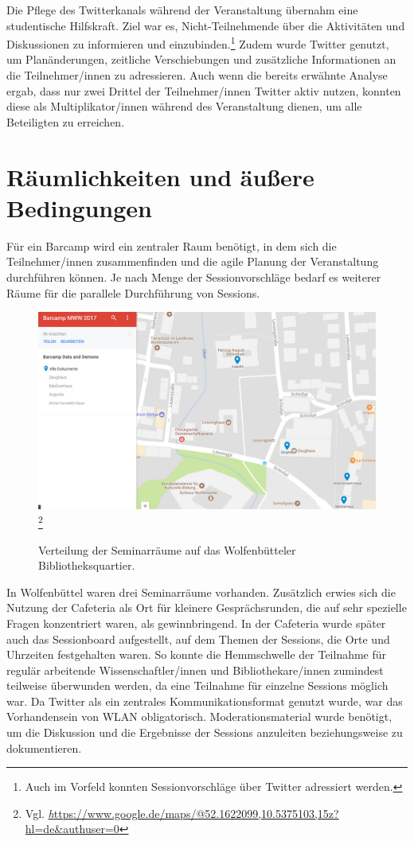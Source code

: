 \documentclass[a4paper,
fontsize=11pt,
oneside,
numbers=noperiodatend,
parskip=half-,
bibliography=totoc,
final
]{scrartcl}
\begin{document}
Die Pflege des Twitterkanals während der Veranstaltung übernahm eine
studentische Hilfskraft. Ziel war es, Nicht-Teilnehmende über die
Aktivitäten und Diskussionen zu informieren und einzubinden.\footnote{Auch
  im Vorfeld konnten Sessionvorschläge über Twitter adressiert werden.}
Zudem wurde Twitter genutzt, um Planänderungen, zeitliche Verschiebungen
und zusätzliche Informationen an die Teilnehmer/innen zu adressieren.
Auch wenn die bereits erwähnte Analyse ergab, dass nur zwei Drittel der
Teilnehmer/innen Twitter aktiv nutzen, konnten diese als
Multiplikator/innen während des Veranstaltung dienen, um alle
Beteiligten zu erreichen.

\section{Räumlichkeiten und äußere
Bedingungen}\label{ruxe4umlichkeiten-und-uxe4uuxdfere-bedingungen}

Für ein Barcamp wird ein zentraler Raum benötigt, in dem sich die
Teilnehmer/innen zusammenfinden und die agile Planung der Veranstaltung
durchführen können. Je nach Menge der Sessionvorschläge bedarf es
weiterer Räume für die parallele Durchführung von Sessions.

\begin{figure}
\centering
\includegraphics[width=0.7\columnwidth]{img/Abbildung2.jpg}\footnote{Vgl. \href{https://www.google.de/maps/@52.1622099,10.5375103,15z?hl=de\&authuser=0}{\emph https://www.google.de/maps/@52.1622099,10.5375103,15z?hl=de\&authuser=0}}
\caption{Verteilung der Seminarräume auf das Wolfenbütteler Bibliotheksquartier.}
\end{figure}

In Wolfenbüttel waren drei Seminarräume vorhanden. Zusätzlich erwies
sich die Nutzung der Cafeteria als Ort für kleinere Gesprächsrunden, die
auf sehr spezielle Fragen konzentriert waren, als gewinnbringend. In der
Cafeteria wurde später auch das Sessionboard aufgestellt, auf dem Themen
der Sessions, die Orte und Uhrzeiten festgehalten waren. So konnte die
Hemmschwelle der Teilnahme für regulär arbeitende Wissenschaftler/innen
und Bibliothekare/innen zumindest teilweise überwunden werden, da eine
Teilnahme für einzelne Sessions möglich war. Da Twitter als ein
zentrales Kommunikationsformat genutzt wurde, war das Vorhandensein von
WLAN obligatorisch. Moderationsmaterial wurde benötigt, um die
Diskussion und die Ergebnisse der Sessions anzuleiten beziehungsweise zu
dokumentieren.
\end{document}
